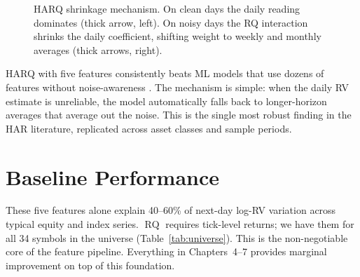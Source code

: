 \begin{figure}[htbp]
{%
}
\caption{HARQ shrinkage mechanism. On clean days the daily reading dominates (thick arrow, left). On noisy days the RQ interaction shrinks the daily coefficient, shifting weight to weekly and monthly averages (thick arrows, right).}
\label{fig:harq-shrinkage}
\end{figure}

HARQ with five features consistently beats ML models that use dozens of features without noise-awareness \citep{BPQ2016}.
The mechanism is simple: when the daily RV estimate is unreliable, the model automatically falls back to longer-horizon averages that average out the noise.
This is the single most robust finding in the HAR literature, replicated across asset classes and sample periods.


\section{Baseline Performance}
\label{sec:baseline-performance}

These five features alone explain 40--60\% of next-day log-RV variation across typical equity and index series.
$\operatorname{RQ}$ requires tick-level returns; we have them for all 34 symbols in the universe (Table~\ref{tab:universe}).
This is the non-negotiable core of the feature pipeline.
Everything in Chapters~4--7 provides marginal improvement on top of this foundation.

